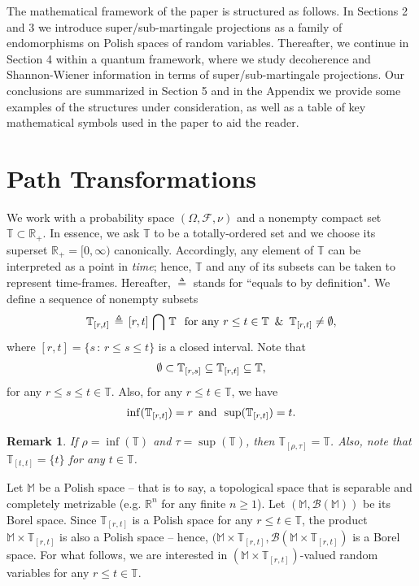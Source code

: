 \documentclass[12pt,a4paper]{article}
\newtheorem{rem}[thm]{Remark}
\def\R{\mathbb{R}}
\def\T{\mathbb{T}}
\def\F{\mathscr{F}}
\begin{document}
The mathematical framework of the paper is structured as follows. In Sections 2 and 3 we introduce super/sub-martingale projections as a family of endomorphisms on Polish spaces of random variables. Thereafter, we continue in Section 4 within a quantum framework, where we study decoherence and Shannon-Wiener information in terms of super/sub-martingale projections. Our conclusions are summarized in Section 5 and in the Appendix we provide some examples of the structures under consideration, as well as a table of key mathematical symbols used in the paper to aid the reader.

\section{Path Transformations}
We work with a probability space $(\Omega,\F,\nu)$ and a nonempty compact set $\T\subset\R_+$. In essence, we ask $\T$ to be a totally-ordered set and we choose its superset $\R_+ = [0,\infty)$ canonically. Accordingly, any element of $\T$ can be interpreted as a point in \emph{time}; hence, $\T$ and any of its subsets can be taken to represent time-frames. Hereafter, $\triangleq$ stands for ``equals to by definition". We define a sequence of nonempty subsets
%
\begin{align}
\T_{[r,t]} \,\triangleq \, [r,t] \,\bigcap \,\T \hspace{0.1in} \text{for any $r\leq t\in\T$} \,\,\,\text{\&}\,\,\, \T_{[r,t]} \neq \emptyset,
\end{align}
%
where $[r,t] = \{s \,:\, r \leq s \leq t\}$ is a closed interval. Note that 
\begin{align}
\emptyset \subset \T_{[r,s]} \subseteq \T_{[r,t]} \subseteq \T, \notag 
\end{align}
for any $r\leq s\leq t \in \T$. Also, for any $r\leq t \in \T$, we have 
\begin{align}
\inf(\T_{[r,t]}) = r \,\,\, \text{and} \,\,\, \sup(\T_{[r,t]}) = t. \notag
\end{align}
%
\begin{rem} {\em
If $\rho = \inf(\T)$ and $\tau = \sup(\T)$, then $\T_{[\rho,\tau]} = \T$. Also, note that $\T_{[t,t]} = \{t\}$ for any $t\in\T$.}
\end{rem}
%
Let $\mathbb M$ be a Polish space -- that is to say, a topological space that is separable and completely metrizable (e.g. $\mathbb{R}^n$ for any finite $n\geq1$). Let $(\mathbb M,\mathscr{B}(\mathbb M))$ be its Borel space. Since $\T_{[r,t]}$ is a Polish space for any $r\leq t\in\T$, the product $\mathbb M\times\T_{[r,t]}$ is also a Polish space -- hence, $(\mathbb M\times\T_{[r,t]},\mathscr{B}(\mathbb M\times\T_{[r,t]})$ is a Borel space. For what follows, we are interested in $(\mathbb M\times\T_{[r,t]})$-valued random variables for any $r\leq t\in\T$. 
\end{document}

